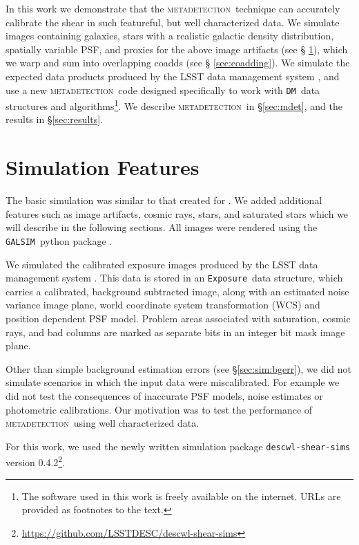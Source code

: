 \documentclass[twocolumn,twocolappendix,astrosym]{openjournal}
\newcommand{\galsim}{\texttt{GALSIM}}
\newcommand{\calexp}{\texttt{Exposure}}
\newcommand{\dmshort}{\texttt{DM}}
\newcommand{\dm}{\texttt{LSST DM}}
\newcommand{\mdet}{\textsc{metadetection}}
\begin{document}
In this work we demonstrate that the \mdet\ technique can accurately calibrate
the shear in such featureful, but well characterized data.  We simulate images
containing galaxies, stars with a realistic galactic density distribution,
spatially variable PSF, and proxies for the above image artifacts (see \S
\ref{sec:sim}), which we warp and sum into overlapping coadds (see \S
\ref{sec:coadding}).  We simulate the expected data products produced by the
LSST data management system \citep[\dm,][]{JuricLSST2015,BoschHSC2017}, and use
a new \mdet\ code designed specifically to work with \dmshort\ data structures
and algorithms\footnote{The software used in this work is freely available on
the internet.  URLs are provided as footnotes to the text.}.  We describe
\mdet\ in \S \ref{sec:mdet}, and the results in \S \ref{sec:results}.

\section{Simulation Features} \label{sec:sim}

The basic simulation was similar to that created for \citep{mdet20}.  We added
additional features such as image artifacts, cosmic rays, stars, and saturated
stars which we will describe in the following sections.  All images were
rendered using the \galsim\ python package \citep{galsim2015}.

We simulated the calibrated exposure images produced by the LSST data
management system \citep[][\dm, version 0.2021.32]{JuricLSST2015,BoschHSC2017}.
This data is stored in an \calexp\ data structure, which carries a calibrated,
background subtracted image, along with an estimated noise variance image
plane, world coordinate system transformation (WCS) and position dependent PSF
model.  Problem areas associated with saturation, cosmic rays, and bad columns
are marked as separate bits in an integer bit mask image plane.

Other than simple background estimation errors (see \S \ref{sec:sim:bgerr}), we
did not simulate scenarios in which the input data were miscalibrated.  For
example we did not test the consequences of inaccurate PSF models, noise
estimates or photometric calibrations.  Our motivation was to test the
performance of \mdet\ using well characterized data.

For this work, we used the newly written simulation package
\texttt{descwl-shear-sims} version
0.4.2\footnote{\url{https://github.com/LSSTDESC/descwl-shear-sims}}.
\end{document}
